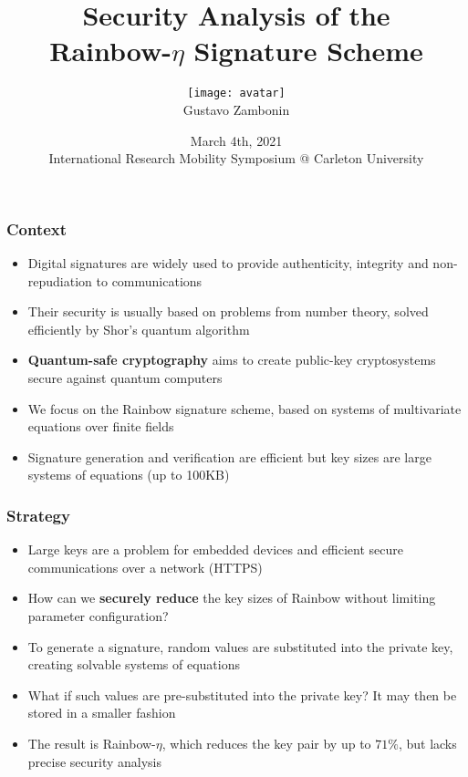 \documentclass[12pt]{beamer}
\title{
  Security Analysis of the\\
  Rainbow-$\eta$ Signature Scheme
}
\author[G. Zambonin (\texttt{gustavo.zambonin@uottawa.ca})]
{\texttt{[image: avatar]} \\ \vspace{2mm}
  Gustavo Zambonin}
\institute{School of Electrical Engineering and Computer Science \\
  University of Ottawa
}
\date{March 4th, 2021 \\
  {\scriptsize International Research Mobility Symposium @ Carleton University}
}
\begin{document}
\begin{frame}
  \titlepage{}
\end{frame}

\begin{frame}
  \frametitle{Context}
  \begin{itemize}
    \item Digital signatures are widely used to provide authenticity, integrity
        and non-repudiation to communications
    \item Their security is usually based on problems from number theory,
        solved efficiently by Shor's quantum algorithm
    \item \textbf{Quantum-safe cryptography} aims to create public-key
        cryptosystems secure against quantum computers
    \item We focus on the Rainbow signature scheme, based on systems of
        multivariate equations over finite fields
    \item Signature generation and verification are efficient but key
        sizes are large systems of equations (up to 100KB)
  \end{itemize}
\end{frame}

\begin{frame}
  \frametitle{Strategy}
  \begin{itemize}
    \item Large keys are a problem for embedded devices and efficient secure
        communications over a network (HTTPS)
    \item How can we \textbf{securely reduce} the key sizes of Rainbow without
        limiting parameter configuration?
    \item To generate a signature, random values are substituted into the
        private key, creating solvable systems of equations
    \item What if such values are pre-substituted into the private key? It may
        then be stored in a smaller fashion
    \item The result is Rainbow-$\eta$, which reduces the key pair by up to
        $71\%$, but lacks precise security analysis
  \end{itemize}
\end{frame}
\end{document}
